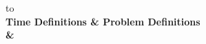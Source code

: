 \documentclass[10pt,a4paper]{article}
\begin{document}
\begin{tabu} to \textwidth{|X[c]|X[c]|} \hline
   \\ \hline
  \rowfont\bfseries Time Definitions & Problem Definitions \\ \hline
   &  \\ \hline
\end{tabu}
\end{document}
